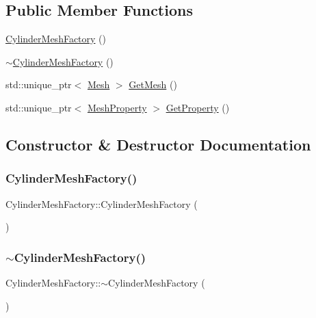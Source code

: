\subsection*{Public Member Functions}
\begin{DoxyCompactItemize}
\item 
\mbox{\hyperlink{class_cylinder_mesh_factory_a9550de96c955d3241fec9c41bab43a24}{Cylinder\+Mesh\+Factory}} ()
\item 
\mbox{\hyperlink{class_cylinder_mesh_factory_ad7182f0fb1217b9d9ab5270f10ebb007}{$\sim$\+Cylinder\+Mesh\+Factory}} ()
\item 
std\+::unique\+\_\+ptr$<$ \mbox{\hyperlink{class_mesh}{Mesh}} $>$ \mbox{\hyperlink{class_cylinder_mesh_factory_a6693199a1ec7dc082b56be29213b97d2}{Get\+Mesh}} ()
\item 
std\+::unique\+\_\+ptr$<$ \mbox{\hyperlink{class_mesh_property}{Mesh\+Property}} $>$ \mbox{\hyperlink{class_cylinder_mesh_factory_a3fa17fc0e14db4007c9c2a6cdeb1d8fa}{Get\+Property}} ()
\end{DoxyCompactItemize}


\subsection{Constructor \& Destructor Documentation}
\mbox{\label{class_cylinder_mesh_factory_a9550de96c955d3241fec9c41bab43a24}} 
\subsubsection{\texorpdfstring{CylinderMeshFactory()}{CylinderMeshFactory()}}
{\footnotesize\ttfamily Cylinder\+Mesh\+Factory\+::\+Cylinder\+Mesh\+Factory (\begin{DoxyParamCaption}{ }\end{DoxyParamCaption})}

\mbox{\label{class_cylinder_mesh_factory_ad7182f0fb1217b9d9ab5270f10ebb007}} 
\subsubsection{\texorpdfstring{$\sim$CylinderMeshFactory()}{~CylinderMeshFactory()}}
{\footnotesize\ttfamily Cylinder\+Mesh\+Factory\+::$\sim$\+Cylinder\+Mesh\+Factory (\begin{DoxyParamCaption}{ }\end{DoxyParamCaption})}



